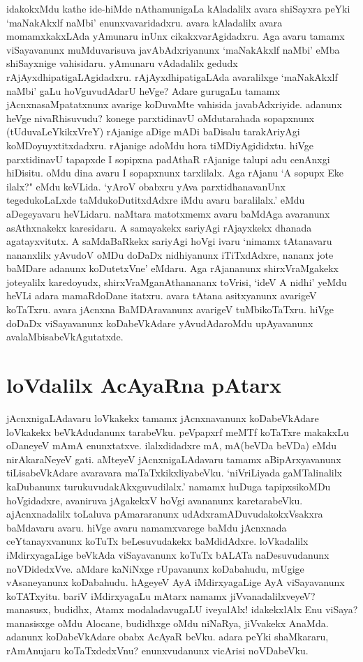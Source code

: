 idakokxMdu kathe ide-hiMde nAthamunigaLa kAladalilx avara shiSayxra peYki `maNakAkxlf naMbi' enunxvavaridadxru. avara kAladalilx avara momamxkakxLAda yAmunaru inUnx cikakxvarAgidadxru. Aga avaru tamamx viSayavanunx  muMduvarisuva  javAbAdxriyanunx `maNakAkxlf naMbi' eMba shiSayxnige vahisidaru. yAmunaru vAdadalilx gedudx rAjAyxdhipatigaLAgidadxru. rAjAyxdhipatigaLAda avaralilxge `maNakAkxlf naMbi' gaLu hoVguvudAdarU heVge? Adare gurugaLu tamamx jAcnxnasaMpatatxnunx avarige koDuvaMte vahisida javabAdxriyide. adanunx heVge nivaRhisuvudu? konege parxtidinavU oMdutarahada sopapxnunx  (tUduvaLeYkikxVreY) rAjanige aDige mADi baDisalu tarakAriyAgi koMDoyuyxtitxdadxru. rAjanige adoMdu hora tiMDiyAgididxtu. hiVge parxtidinavU tapapxde I sopipxna padAthaR rAjanige talupi adu cenAnxgi hiDisitu. oMdu dina avaru I sopapxnunx tarxlilalx. Aga rAjanu `A sopupx  Eke ilalx?" eMdu keVLida. `yAroV obabxru yAva parxtidhanavanUnx tegedukoLaLxde taMdukoDutitxdAdxre iMdu avaru baralilalx.' eMdu aDegeyavaru heVLidaru. naMtara matotxmemx avaru baMdAga avaranunx asAthxnakekx karesidaru. A samayakekx sariyAgi rAjayxkekx dhanada agatayxvitutx. A saMdaBaRkekx sariyAgi hoVgi ivaru `nimamx tAtanavaru nananxlilx yAvudoV oMDu doDaDx nidhiyanunx iTiTxdAdxre, nananx jote baMDare adanunx koDutetxVne' eMdaru. Aga rAjananunx shirxVraMgakekx  joteyalilx karedoyudx, shirxVraMganAthanananx toVrisi, `ideV A nidhi' yeMdu heVLi adara mamaRdoDane itatxru. avara tAtana asitxyanunx avarigeV koTaTxru. avara jAcnxna BaMDAravanunx avarigeV tuMbikoTaTxru. hiVge doDaDx viSayavanunx koDabeVkAdare yAvudAdaroMdu upAyavanunx avalaMbisabeVkAgutatxde.

\section*{loVdalilx AcAyaRna pAtarx}

jAcnxnigaLAdavaru loVkakekx tamamx jAcnxnavanunx koDabeVkAdare loVkakekx beVkAdudanunx tarabeVku. peVpapxrf meMTf koTaTxre makakxLu oDaneyeV mAmA enunxtatxve. ilalxdidadxre mA, mA(beVDa beVDa) eMdu nirAkaraNeyeV gati. aMteyeV jAcnxnigaLAdavaru tamamx aBipArxyavanunx tiLisabeVkAdare avaravara maTaTxkikxliyabeVku. `niVriLiyada gaMTalinalilx kaDubanunx turukuvudakAkxguvudilalx.' namamx huDuga tapipxsikoMDu hoVgidadxre, avaniruva jAgakekxV hoVgi avananunx karetarabeVku. ajAcnxnadalilx toLaluva pAmararanunx udAdxramADuvudakokxVsakxra baMdavaru avaru. hiVge avaru namamxvarege baMdu jAcnxnada ceYtanayxvanunx koTuTx beLesuvudakekx baMdidAdxre. loVkadalilx iMdirxyagaLige beVkAda viSayavanunx koTuTx bALATa naDesuvudanunx noVDidedxVve. aMdare kaNiNxge rUpavanunx koDabahudu, mUgige vAsaneyanunx koDabahudu. hAgeyeV AyA iMdirxyagaLige AyA viSayavanunx  koTATxyitu. bariV iMdirxyagaLu mAtarx namamx jiVvanadalilxveyeV? manasusx, budidhx, Atamx modaladavugaLU iveyalAlx! idakekxlAlx Enu viSaya? manasisxge oMdu Alocane, budidhxge oMdu niNaRya, jiVvakekx AnaMda. adanunx koDabeVkAdare obabx AcAyaR beVku. adara peYki shaMkararu, rAmAnujaru koTaTxdedxVnu? enunxvudanunx vicArisi noVDabeVku. 

